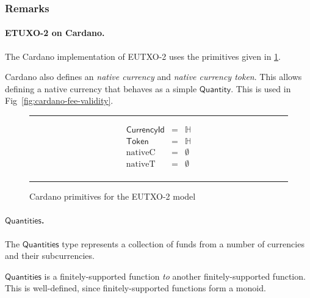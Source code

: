 \documentclass[a4paper]{article}
\newcommand{\s}{\textsf}  %
\newcommand\rfskip{7pt}
\newenvironment{ruledfigure}[1]{\begin{figure}[#1]\hrule\vspace{\rfskip}}{\vspace{\rfskip}\hrule\end{figure}}
\newcommand{\qty}{\ensuremath{\s{Quantity}}}
\newcommand{\token}{\ensuremath{\s{Token}}}
\newcommand{\currency}{\ensuremath{\s{CurrencyId}}}
\newcommand{\nativeCur}{\ensuremath{\mathrm{nativeC}}}
\newcommand{\nativeTok}{\ensuremath{\mathrm{nativeT}}}
\newcommand{\qtymap}{\ensuremath{\s{Quantities}}}
\renewcommand\H{\ensuremath{\mathbb{H}}}
\newcommand{\emptyBs}{\ensuremath{\emptyset}}
\begin{document}
\subsubsection{Remarks}
\paragraph{ETUXO-2 on Cardano.}
The Cardano implementation of EUTXO-2 uses the primitives given in
\cref{fig:eutxo-2-types-cardano}.

Cardano also defines an \emph{native currency} and \emph{native currency token}.
This allows defining a native currency that behaves as a simple \qty{}. This
is used in Fig~\ref{fig:cardano-fee-validity}.
\begin{ruledfigure}{H}
  \begin{displaymath}
    \begin{array}{rll}
      \currency  &=& \H\\
      \token     &=& \H\\
      \nativeCur &=& \emptyBs\\
      \nativeTok &=& \emptyBs\\
    \end{array}
  \end{displaymath}
  \caption{Cardano primitives for the EUTXO-2 model}
  \label{fig:eutxo-2-types-cardano}
\end{ruledfigure}

\paragraph{\qtymap{}. }
The \qtymap{} type represents a collection of funds from a
number of currencies and their subcurrencies.

\qtymap{} is a finitely-supported function \emph{to} another finitely-supported
function. This is well-defined, since finitely-supported functions form a monoid.
\end{document}
